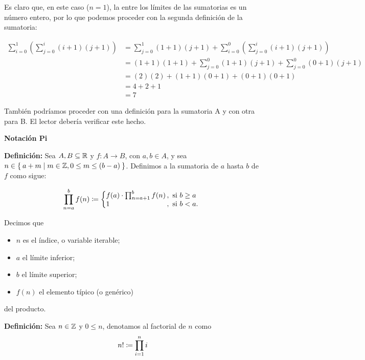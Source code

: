 Es claro que, en este caso ($n=1$), la  entre los límites de las sumatorias es un número entero, por lo que podemos proceder con la segunda definición de la sumatoria:

\begin{align*}
  \sum_{i=0}^{1} \left(\sum_{j=0}^{i}(i+1)(j+1)\right) &= \sum_{j=0}^{1} (1+1) (j+1) + \sum_{i=0}^{0} \left(\sum_{j=0}^{i}(i+1)(j+1)\right)\\
  &= (1+1)(1+1) + \sum_{j=0}^{0} (1+1) (j+1) + \sum_{j=0}^{0} (0+1)(j+1)\\
  &= (2)(2) + (1+1)(0+1) + (0+1)(0+1)\\
  &= 4 + 2 + 1\\
  &= 7
\end{align*}

También podríamos proceder con una definición para la sumatoria A y con otra para B. El lector debería verificar este hecho.


\textbf{Notación Pi}

\textbf{Definición:} Sea $A, B\subseteq \mathbb{R}$ y $f:A \to B$, con $a,b\in A$, y sea $n \in \Set{a + m | m\in \mathbb{Z}, 0\leq m \leq (b-a)}$. Definimos a la sumatoria de $a$ hasta $b$ de $f$ como sigue:

\[
    \prod_{n=a}^{b} f(n) \defined \left\{
    \begin{array}{@{}l@{\thinspace}l}
    f(a) \cdot \prod_{n=a+1}^{b} f(n) &,  \ \text{si}  \ b\geq a\\
    1 &,  \ \text{si}  \ b<a.
    \end{array} \right. \]

Decimos que
\begin{itemize}
  \item $n$ es el índice, o variable iterable;
  \item $a$ el límite inferior;
  \item $b$ el límite superior;
  \item $f(n)$ el elemento típico (o genérico)
\end{itemize}
del producto.

\textbf{Definición:} Sea $n\in \mathbb{Z}$ y $0\leq n$, denotamos al factorial de $n$ como \[n!\coloneqq \prod_{i=1}^{n}i\]
